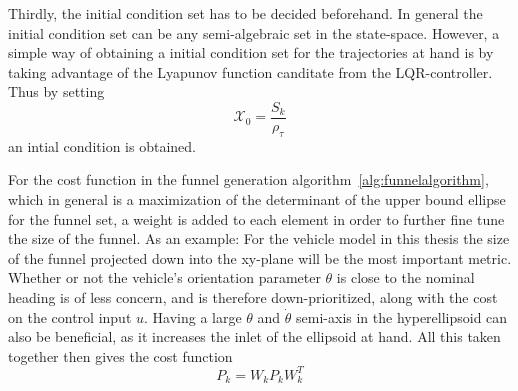 Thirdly, the initial condition set has to be decided beforehand. In general the
initial condition set can be any semi-algebraic set in the state-space. However,
a simple way of obtaining a initial condition set for the trajectories at hand
is by taking advantage of the Lyapunov function canditate from the
\ac{LQR}-controller. Thus by setting
\begin{equation}
  \mathcal{X}_{0} = \frac{S_{k}}{\rho_{\tau}}
\end{equation}
an intial condition is obtained.

For the cost function in the funnel generation
algorithm~\ref{alg:funnelalgorithm}, which in general is a maximization of the
determinant of the upper bound ellipse for the funnel set, a weight is added to
each element in order to further fine tune the size of the funnel. As an
example: For the vehicle model in this thesis the size of the funnel projected
down into the xy-plane will be the most important metric. Whether or not the
vehicle's orientation parameter \(\theta\) is close to the nominal heading is of
less concern, and is therefore down-prioritized, along with the cost on the
control input \(u\). Having a large \(\theta\) and \(\dot{\theta}\) semi-axis in
the hyperellipsoid can also be beneficial, as it increases the inlet of the
ellipsoid at hand. All this taken together then gives the cost function
\begin{equation}
  P_{k} = W_{k}P_{k}W_{k}^{T}
\end{equation}

